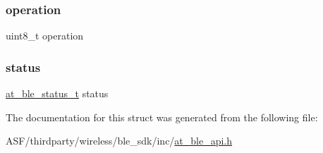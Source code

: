 \subsubsection{\texorpdfstring{operation}{operation}}
{\footnotesize\ttfamily uint8\+\_\+t operation}

\mbox{\label{structat__ble__gapc__cmp__evt__t_a0b48093fc2030779fc47e5216f8019e2}} 
\subsubsection{\texorpdfstring{status}{status}}
{\footnotesize\ttfamily \mbox{\hyperlink{group__error__codes__group_ga3b1db9b95feb157b3c188ca27fe76988}{at\+\_\+ble\+\_\+status\+\_\+t}} status}



The documentation for this struct was generated from the following file\+:\begin{DoxyCompactItemize}
\item 
A\+S\+F/thirdparty/wireless/ble\+\_\+sdk/inc/\mbox{\hyperlink{at__ble__api_8h}{at\+\_\+ble\+\_\+api.\+h}}\end{DoxyCompactItemize}
